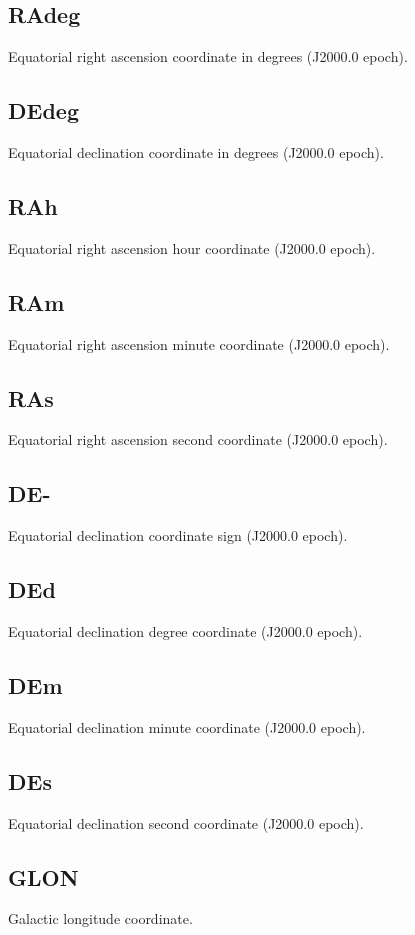 \documentclass[iop]{emulateapj-rtx4}
\begin{document}
\subsection{RAdeg}
Equatorial right ascension coordinate in degrees (J2000.0 epoch).

\subsection{DEdeg}
Equatorial declination coordinate in degrees (J2000.0 epoch).

\subsection{RAh}
Equatorial right ascension hour coordinate (J2000.0 epoch).

\subsection{RAm}
Equatorial right ascension minute coordinate (J2000.0 epoch).

\subsection{RAs}
Equatorial right ascension second coordinate (J2000.0 epoch).

\subsection{DE-}
Equatorial declination coordinate sign (J2000.0 epoch).

\subsection{DEd}
Equatorial declination degree coordinate (J2000.0 epoch).

\subsection{DEm}
Equatorial declination minute coordinate (J2000.0 epoch).

\subsection{DEs}
Equatorial declination second coordinate (J2000.0 epoch).

\subsection{GLON}
Galactic longitude coordinate.
\end{document}

